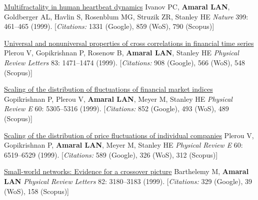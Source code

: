 \NumberedItem{\makebox[0.8cm][r]{[30]}}
\href{/people/amaral/multifractality-in-human-heartbeat-dynamics}
{Multifractality in human heartbeat dynamics}
\newline
Ivanov PC, {\textbf{Amaral LAN}}, Goldberger AL, Havlin S, Rosenblum MG, Struzik ZR, Stanley HE
\newline
\textit{Nature}
    399:
461--465 (1999).
    [{\em{Citations:}} 1331 (Google), 859 (WoS), 790 (Scopus)]
\newline
\Gap
~
\Gap

\NumberedItem{\makebox[0.8cm][r]{[29]}}
\href{/people/amaral/universal-and-nonuniversal-properties-of-cross-correlations-in-financial-time-series}
{Universal and nonuniversal properties of cross correlations in financial time series}
\newline
Plerou V, Gopikrishnan P, Rosenow B, {\textbf{Amaral LAN}}, Stanley HE
\newline
\textit{Physical Review Letters}
    83:
1471--1474 (1999).
    [{\em{Citations:}} 908 (Google), 566 (WoS), 548 (Scopus)]
\newline
\Gap
~
\Gap

\NumberedItem{\makebox[0.8cm][r]{[28]}}
\href{/people/amaral/scaling-of-the-distribution-of-fluctuations-of-financial-market-indices}
{Scaling of the distribution of fluctuations of financial market indices}
\newline
Gopikrishnan P, Plerou V, {\textbf{Amaral LAN}}, Meyer M, Stanley HE
\newline
\textit{Physical Review E}
    60:
5305--5316 (1999).
    [{\em{Citations:}} 852 (Google), 493 (WoS), 489 (Scopus)]
\newline
\Gap
~
\Gap

\NumberedItem{\makebox[0.8cm][r]{[27]}}
\href{/people/amaral/scaling-of-the-distribution-of-price-fluctuations-of-individual-companies}
{Scaling of the distribution of price fluctuations of individual companies}
\newline
Plerou V, Gopikrishnan P, {\textbf{Amaral LAN}}, Meyer M, Stanley HE
\newline
\textit{Physical Review E}
    60:
6519--6529 (1999).
    [{\em{Citations:}} 589 (Google), 326 (WoS), 312 (Scopus)]
\newline
\Gap
~
\Gap

\NumberedItem{\makebox[0.8cm][r]{[26]}}
\href{/people/amaral/small-world-networks-evidence-for-a-crossover-picture}
{Small-world networks: Evidence for a crossover picture}
\newline
Barthelemy M, {\textbf{Amaral LAN}}
\newline
\textit{Physical Review Letters}
    82:
3180--3183 (1999).
    [{\em{Citations:}} 329 (Google), 39 (WoS), 158 (Scopus)]
\newline
\Gap
~
\Gap

